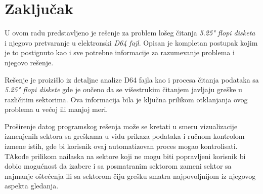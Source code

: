 \section{Zaključak}

U ovom radu predstavljeno je rešenje za problem lošeg čitanja \textit{5.25" flopi disketa} i njegovo pretvaranje u elektronski \textit{D64 fajl}. Opisan je kompletan postupak kojim je to postignuto kao i sve potrebne informacije za razumevanje problema i njegovo rešenje. 

Rešenje je proizišlo iz detaljne analize D64 fajla kao i procesa čitanja podataka sa \textit{5.25" flopi diskete} gde je oučeno da se višestrukim čitanjem javljaju greške u različitim sektorima. Ova informacija bila je ključna prilikom otklanjanja ovog problema u većoj ili manjoj meri.

Proširenje datog programskog rešenja može se kretati u smeru vizualizacije izmenjenih sektora sa greškama u vidu prikaza podataka i ručnom kontrolom izmene istih, gde bi korisnik ovaj automatizovan proces mogao kontrolisati. TAkođe prilikom nailaska na sektore koji ne mogu biti popravljeni korisnik bi dobio mogućnost da izabere i sa posmatranim sektorom zameni sektor sa najmanje oštećenja ili sa sektorom čiju grešku smatra najpovoljnijom iz njegovog aspekta gledanja.